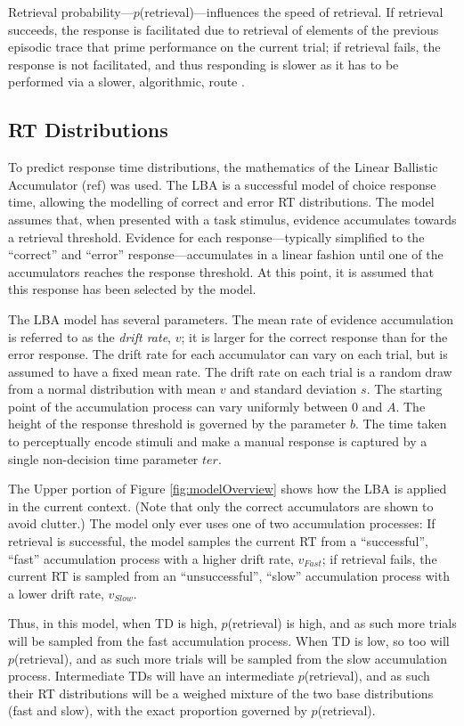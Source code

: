 \documentclass[a4paper, jou, natbib]{apa6}
\begin{document}
Retrieval probability---$p$(retrieval)---influences the speed of retrieval. If retrieval succeeds, the response is facilitated due to retrieval of elements of the previous episodic trace that prime performance on the current trial; if retrieval fails, the response is not facilitated, and thus responding is slower as it has to be performed via a slower, algorithmic, route \citep[see][for discussion]{Grange2015}.

\subsection{RT Distributions}
To predict response time distributions, the mathematics of the Linear Ballistic Accumulator (ref) was used. The LBA is a successful model of choice response time, allowing the modelling of correct and error RT distributions. The model assumes that, when presented with a task stimulus, evidence accumulates towards a retrieval threshold. Evidence for each response---typically simplified to the ``correct'' and ``error'' response---accumulates in a linear fashion until one of the accumulators reaches the response threshold. At this point, it is assumed that this response has been selected by the model. 

The LBA model has several parameters. The mean rate of evidence accumulation is referred to as the \emph{drift rate}, $v$; it is larger for the correct response than for the error response. The drift rate for each accumulator can vary on each trial, but is assumed to have a fixed mean rate. The drift rate on each trial is a random draw from a normal distribution with mean $v$ and standard deviation $s$. The starting point of the accumulation process can vary uniformly between 0 and $A$. The height of the response threshold is governed by the parameter $b$. The time taken to perceptually encode stimuli and make a manual response is captured by a single non-decision time parameter $ter$. 

The Upper portion of Figure \ref{fig:modelOverview} shows how the LBA is applied in the current context. (Note that only the correct accumulators are shown to avoid clutter.) The model only ever uses one of two accumulation processes: If retrieval is successful, the model samples the current RT from a ``successful'', ``fast'' accumulation process with a higher drift rate, $v_{Fast}$; if retrieval fails, the current RT is sampled from an ``unsuccessful'', ``slow'' accumulation process with a lower drift rate, $v_{Slow}$. 

Thus, in this model, when TD is high, $p$(retrieval) is high, and as such more trials will be sampled from the fast accumulation process. When TD is low, so too will  $p$(retrieval), and as such more trials will be sampled from the slow accumulation process. Intermediate TDs will have an intermediate $p$(retrieval), and as such their RT distributions will be a weighed mixture of the two base distributions (fast and slow), with the exact proportion governed by $p$(retrieval). 
\end{document}
